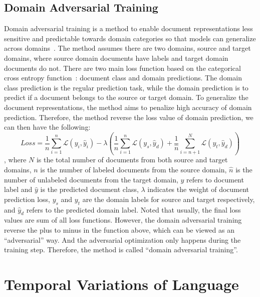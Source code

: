 
\subsection{Domain Adversarial Training}

Domain adversarial training is a method to enable document representations less sensitive and predictable towards domain categories so that models can generalize across domains~\cite{ganin2016domain}.
The method assumes there are two domains, source and target domains, where source domain documents have labels and target domain documents do not.
There are two main loss function based on the categorical cross entropy function~\cite{goodfellow2016deep}: document class and domain predictions.
The domain class prediction is the regular prediction task, while the domain prediction is to predict if a document belongs to the source or target domain.
To generalize the document representations, the method aims to penalize high accuracy of domain prediction.
Therefore, the method reverse the loss value of domain prediction, we can then have the following:
$$Loss = \frac{1}{n}\sum_{i=1}^n\mathcal{L}(y_i, \hat{y}_i) - \lambda(\frac{1}{n}\sum_{i=1}^n\mathcal{L}(y_s, \hat{y}_d) + \frac{1}{\hat{n}}\sum_{i=n+1}^N\mathcal{L}(y_t, \hat{y}_d))$$
, where $N$ is the total number of documents from both source and target domains, $n$ is the number of labeled documents from the source domain, $\hat{n}$ is the number of unlabeled documents from the target domain, $y$ refers to document label and $\hat{y}$ is the predicted document class, $\lambda$ indicates the weight of document prediction loss, $y_s$ and $y_t$ are the domain labels for source and target respectively, and $\hat{y}_d$ refers to the predicted domain label.
Noted that usually, the final loss values are sum of all loss functions.
However, the domain adversarial training reverse the plus to minus in the function above, which can be viewed as an ``adversarial'' way.
And the adversarial optimization only happens during the training step.
Therefore, the method is called ``domain adversarial training''. 


\section{Temporal Variations of Language}
\label{chap2:sec:time}

